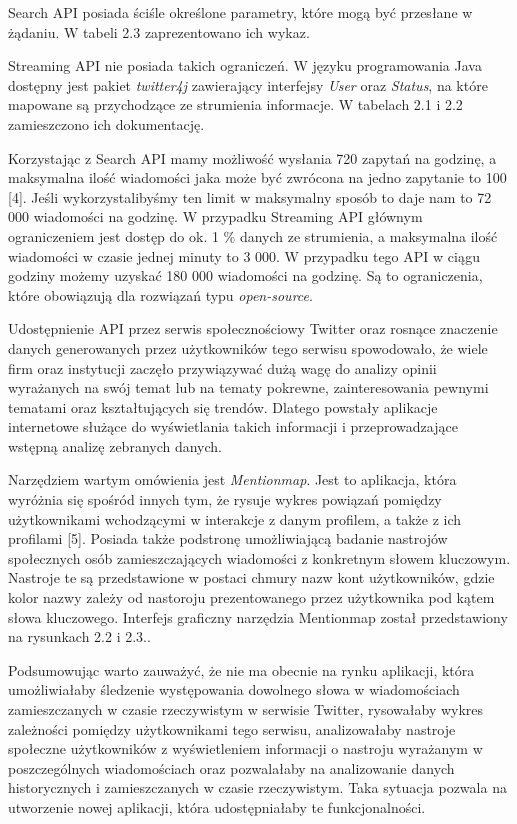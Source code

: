 Search API posiada ściśle określone parametry, które mogą być przesłane w żądaniu. W tabeli 2.3 zaprezentowano ich wykaz.

Streaming API nie posiada takich ograniczeń. W języku programowania Java dostępny jest pakiet \textit{twitter4j} zawierający interfejsy \textit{User} oraz \textit{Status}, na które mapowane są przychodzące ze strumienia informacje. W tabelach 2.1 i 2.2 zamieszczono ich dokumentację. 

Korzystając z Search API mamy możliwość wysłania 720 zapytań na godzinę, a maksymalna ilość wiadomości jaka może być zwrócona na jedno zapytanie to 100 [4]. Jeśli wykorzystalibyśmy ten limit w maksymalny sposób to daje nam to 72 000 wiadomości na godzinę. W przypadku Streaming API głównym ograniczeniem jest dostęp do ok. 1 \% danych ze strumienia, a maksymalna ilość wiadomości w czasie jednej minuty to 3 000. W przypadku tego API w ciągu godziny możemy uzyskać 180 000 wiadomości na godzinę. Są to ograniczenia, które obowiązują dla rozwiązań typu \textit{open-source}.

Udostępnienie API przez serwis społecznościowy Twitter oraz rosnące znaczenie danych generowanych przez użytkowników tego serwisu spowodowało, że wiele firm oraz instytucji zaczęło przywiązywać dużą wagę do analizy opinii wyrażanych na swój temat lub na tematy pokrewne, zainteresowania pewnymi tematami oraz kształtujących się trendów. Dlatego powstały aplikacje internetowe służące do wyświetlania takich informacji i przeprowadzające wstępną analizę zebranych danych.

Narzędziem wartym omówienia jest \textit{Mentionmap}. Jest to aplikacja, która wyróżnia się spośród innych tym, że rysuje wykres powiązań pomiędzy użytkownikami wchodzącymi w interakcje z danym profilem, a także z ich profilami [5]. Posiada także podstronę umożliwiającą badanie nastrojów społecznych osób zamieszczających wiadomości z konkretnym słowem kluczowym. Nastroje te są przedstawione w postaci chmury nazw kont użytkowników, gdzie kolor nazwy zależy od nastoroju prezentowanego przez użytkownika pod kątem słowa kluczowego. Interfejs graficzny narzędzia Mentionmap został przedstawiony na rysunkach 2.2 i 2.3..

Podsumowując warto zauważyć, że nie ma obecnie na rynku aplikacji, która umożliwiałaby śledzenie występowania dowolnego słowa w wiadomościach zamieszczanych w czasie rzeczywistym w serwisie Twitter, rysowałaby wykres zależności pomiędzy użytkownikami tego serwisu, analizowałaby nastroje społeczne użytkowników z wyświetleniem informacji o nastroju wyrażanym w poszczególnych wiadomościach oraz pozwalałaby na analizowanie danych historycznych i zamieszczanych w czasie rzeczywistym. Taka sytuacja pozwala na utworzenie nowej aplikacji, która udostępniałaby te funkcjonalności. 

